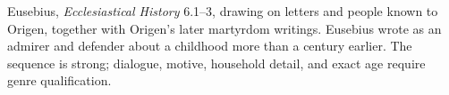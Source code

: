 {Eusebius, \emph{Ecclesiastical History} 6.1--3, drawing on letters and people
known to Origen, together with Origen's later martyrdom writings.}
{Eusebius wrote as an admirer and defender about a childhood more than a
century earlier. The sequence is strong; dialogue, motive, household detail,
and exact age require genre qualification.}
